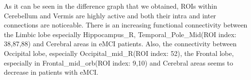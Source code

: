 \documentclass[preprint,12pt]{elsarticle}
\begin{document}
As it can be seen in the difference graph that we obtained, ROIs within Cerebellum and Vermis are highly active and both their intra and inter connections are noticeable. There is an increasing functional connectivity between the Limbic lobe especially 
Hippocampus\_R, Temporal\_Pole\_Mid(ROI index: 38,87,88)
and Cerebral areas in eMCI patients. Also, the connectivity between Occipital lobe, especially Occipital\_mid\_R(ROI index: 52), the Frontal lobe, especially in Frontal\_mid\_orb(ROI index: 9,10) and Cerebral areas seems to decrease in patients with eMCI.




\end{document}
